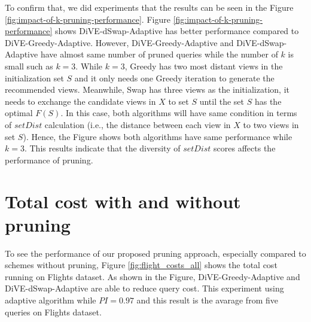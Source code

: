 \documentclass{article}
\begin{document}
To confirm that, we did experiments that the results can be seen in the Figure \ref{fig:impact-of-k-pruning-performance}. Figure \ref{fig:impact-of-k-pruning-performance} shows DiVE-dSwap-Adaptive has better performance compared to DiVE-Greedy-Adaptive. However, DiVE-Greedy-Adaptive and DiVE-dSwap-Adaptive have almost same number of pruned queries while the number of $k$ is small such as $k=3$. While $k=3$, Greedy has two most distant views in the initialization set $S$ and it only needs one Greedy iteration to generate the recommended views. Meanwhile, Swap has three views as the initialization, it needs to exchange the candidate views in $X$ to set $S$ until the set $S$ has the optimal $F(S)$. In this case, both algorithms will have same condition in terms of $setDist$ calculation (i.e., the distance between each view in $X$ to two views in set $S$). Hence, the Figure shows both algorithms have same performance while $k = 3$. This results indicate that the diversity of $setDist$ scores affects the performance of pruning. 



%
%
%







\section{Total cost with and without pruning}
To see the performance of our proposed pruning approach, especially compared to schemes without pruning, Figure \ref{fig:flight_costs_all} shows the total cost running on Flights dataset. As shown in the Figure, DiVE-Greedy-Adaptive and DiVE-dSwap-Adaptive are able to reduce query cost. This experiment using adaptive algorithm while $ PI = 0.97 $ and this result is the avarage from five queries on Flights dataset. 
\end{document}
